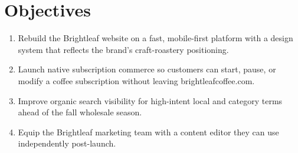 \section{Objectives}

\begin{enumerate}
  \item Rebuild the Brightleaf website on a fast, mobile-first platform with a design system
        that reflects the brand's craft-roastery positioning.
  \item Launch native subscription commerce so customers can start, pause, or modify a coffee
        subscription without leaving brightleafcoffee.com.
  \item Improve organic search visibility for high-intent local and category terms ahead of the
        fall wholesale season.
  \item Equip the Brightleaf marketing team with a content editor they can use independently
        post-launch.
\end{enumerate}
